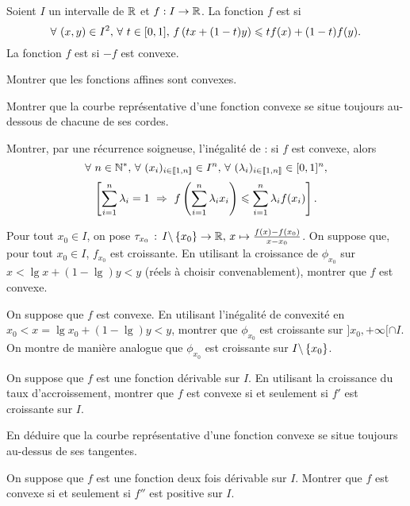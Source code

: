 \documentclass[oneside,11pt]{book}
\begin{document}
\entete
\begin{refsection}

\begin{probleme*}
Soient $I$ un intervalle de $\mathbb{R}$ et $f : I \to \mathbb{R}$. La fonction $f$ est  si
\[
\forall~ (x, y) \in I^2,\, \forall~ t \in [0, 1],\, f\left(t x + (1 - t) y\right) \leqslant t f(x) + (1 - t) f(y).
\]
La fonction $f$ est  si $-f$ est convexe.

\qu Montrer que les fonctions affines sont convexes.

\qu Montrer que la courbe représentative d'une fonction convexe se situe toujours au-dessous de chacune de ses cordes.

\qu Montrer, par une récurrence soigneuse, l'inégalité de \cite{Jensen} : si $f$ est convexe, alors
\[
\forall~ n \in \mathbb{N}^\ast,\, \forall~ (x_i)_{i\in\llbracket1,n\rrbracket} \in I^n,\, \forall~ (\lambda_i)_{i\in\llbracket1,n\rrbracket} \in [0,1]^n,
\]
\[
\left[\sum\limits_{i=1}^n \lambda_i = 1 ~\Rightarrow~ f\left(\sum\limits_{i=1}^n \lambda_i x_i\right) \leqslant \sum\limits_{i=1}^n \lambda_i f(x_i)\right].
\]

\qu {} Pour tout $x_0 \in I$, on pose $\tau_{x_0}\,:\,I\backslash\left\{x_0\right\} \to \mathbb{R},\, x \mapsto \frac{f(x) - f(x_0)}{x - x_0}$.
\squ On suppose que, pour tout $x_0 \in I$, $f_{x_0}$ est croissante. En utilisant la croissance de $\phi_{x_0}$ sur $x < \lg x + (1 - \lg) y < y$ (réels à choisir convenablement), montrer que $f$ est convexe.

\squ On suppose que $f$ est convexe. En utilisant l'inégalité de convexité en $x_0 < x = \lg x_0 + (1 - \lg) y < y$, montrer que $\phi_{x_0}$ est croissante sur $]x_0,+\infty[ \cap I$.\\
On montre de manière analogue que $\phi_{x_0}$ est croissante sur $I \backslash \left\{x_0\right\}$.

\newpage

\qu {}
\squ On suppose que $f$ est une fonction dérivable sur $I$. En utilisant la croissance du taux d'accroissement, montrer que $f$ est convexe si et seulement si $f'$ est croissante sur $I$.

\squ En déduire que la courbe représentative d'une fonction convexe se situe toujours au-dessus de ses tangentes.

\qu {} On suppose que $f$ est une fonction deux fois dérivable sur $I$. Montrer que $f$ est convexe si et seulement si $f''$ est positive sur $I$.


\end{probleme*}
\end{refsection}
\end{document}
